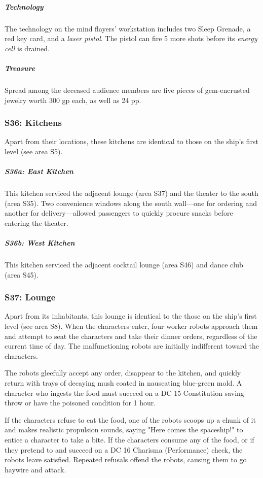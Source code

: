 \documentclass[10pt,a4paper,twoside,bg=print,twocolumn,openany,nodeprecatedcode]{dndbook}
\begin{document}
\subparagraph{Technology}
The technology on the mind flayers' workstation includes two Sleep Grenade, a red key card, and a \textit{laser pistol}. The pistol can fire 5 more shots before its \textit{energy cell} is drained.

\subparagraph{Treasure}
Spread among the deceased audience members are five pieces of gem-encrusted jewelry worth 300 gp each, as well as 24 pp.

\subsubsection{S36: Kitchens}
Apart from their locations, these kitchens are identical to those on the ship's first level (see area S5).

\subparagraph{S36a: East Kitchen}
This kitchen serviced the adjacent lounge (area S37) and the theater to the south (area S35). Two convenience windows along the south wall—one for ordering and another for delivery—allowed passengers to quickly procure snacks before entering the theater.

\subparagraph{S36b: West Kitchen}
This kitchen serviced the adjacent cocktail lounge (area S46) and dance club (area S45).

\subsubsection{S37: Lounge}
Apart from its inhabitants, this lounge is identical to the those on the ship's first level (see area S8). When the characters enter, four worker robots approach them and attempt to seat the characters and take their dinner orders, regardless of the current time of day. The malfunctioning robots are initially indifferent toward the characters.

The robots gleefully accept any order, disappear to the kitchen, and quickly return with trays of decaying mush coated in nauseating blue-green mold. A character who ingests the food must succeed on a DC 15 Constitution saving throw or have the poisoned condition for 1 hour.

If the characters refuse to eat the food, one of the robots scoops up a chunk of it and makes realistic propulsion sounds, saying "Here comes the spaceship!" to entice a character to take a bite. If the characters consume any of the food, or if they pretend to and succeed on a DC 16 Charisma (Performance) check, the robots leave satisfied. Repeated refusals offend the robots, causing them to go haywire and attack.
\end{document}
